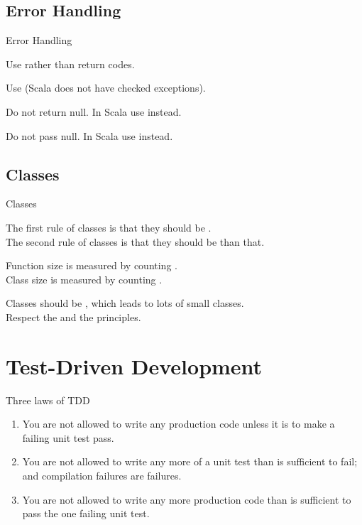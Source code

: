 \subsection{Error Handling}
\begin{frame}{Error Handling}
\begin{center}
Use  rather than \alert{return codes}.
\end{center}
\begin{center}
Use  (Scala does not have checked exceptions).
\end{center}
\begin{center}
\alert{Do not return null.} In Scala use  instead.
\end{center}
\begin{center}
\alert{Do not pass null.} In Scala use  instead.
\end{center}
\end{frame}

\subsection{Classes}
\begin{frame}{Classes}
\begin{center}
The first rule of classes is that they should be .\\
The second rule of classes is that they should be  than
that.\\
\end{center}
\begin{center}
Function size is measured by counting .\\
Class size is measured by counting .
\end{center}
\begin{center}
Classes should be , which leads to lots of small classes.\\
Respect the  and the 
principles.\\
\end{center}
\end{frame}

\section{Test-Driven Development}
\begin{frame}{Three laws of TDD}
\begin{enumerate}
   \item You are not allowed to write any production code unless it is to make
     a failing unit test pass.
   \item You are not allowed to write any more of a unit test than is
     sufficient to fail; and compilation failures are failures.
   \item You are not allowed to write any more production code than is
    sufficient to pass the one failing unit test.
\end{enumerate}
\end{frame}

